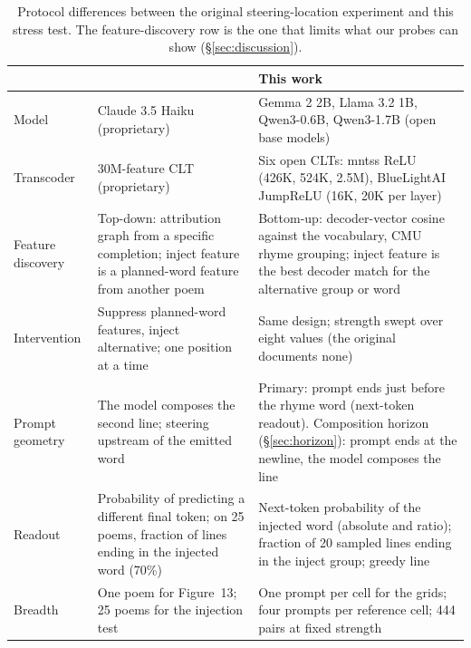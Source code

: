 \documentclass[11pt]{article}
\begin{document}
\begin{table}[t]
\centering\small
\begin{tabular}{@{}R{2.3cm}R{5.4cm}R{6.5cm}@{}}
\toprule
 & \citet{lindsey2025biology} & This work \\
\midrule
Model & Claude 3.5 Haiku (proprietary) & Gemma 2 2B, Llama 3.2 1B, Qwen3-0.6B, Qwen3-1.7B (open base models) \\
Transcoder & 30M-feature CLT (proprietary) & Six open CLTs: mntss ReLU (426K, 524K, 2.5M), BlueLightAI JumpReLU (16K, 20K per layer) \\
Feature discovery & Top-down: attribution graph from a specific completion; inject feature is a planned-word feature from another poem & Bottom-up: decoder-vector cosine against the vocabulary, CMU rhyme grouping; inject feature is the best decoder match for the alternative group or word \\
Intervention & Suppress planned-word features, inject alternative; one position at a time & Same design; strength swept over eight values (the original documents none) \\
Prompt geometry & The model composes the second line; steering upstream of the emitted word & Primary: prompt ends just before the rhyme word (next-token readout). Composition horizon (\S\ref{sec:horizon}): prompt ends at the newline, the model composes the line \\
Readout & Probability of predicting a different final token; on 25 poems, fraction of lines ending in the injected word (70\%) & Next-token probability of the injected word (absolute and ratio); fraction of 20 sampled lines ending in the inject group; greedy line \\
Breadth & One poem for Figure~13; 25 poems for the injection test & One prompt per cell for the grids; four prompts per reference cell; 444 pairs at fixed strength \\
\bottomrule
\end{tabular}
\caption{Protocol differences between the original steering-location experiment and this stress test. The feature-discovery row is the one that limits what our probes can show (\S\ref{sec:discussion}).}
\label{tab:protocol}
\end{table}
\end{document}
